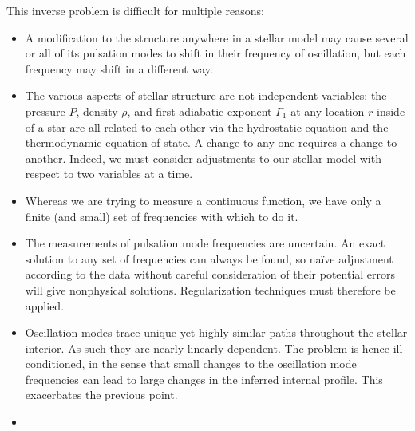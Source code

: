 \documentclass[twocolumn,twocolappendix]{aastex6}
\begin{document}
This inverse problem is difficult for multiple reasons:%
\begin{itemize}
    \item A modification to the structure anywhere in a stellar model may cause several or all of its pulsation modes to shift in their frequency of oscillation, but each frequency may shift in a different way. 
    \item The various aspects of stellar structure are not independent variables: the pressure $P$, density $\rho$, and first adiabatic exponent $\Gamma_1$ at any location $r$ inside of a star are all related to each other via the hydrostatic equation and the thermodynamic equation of state. 
    A change to any one requires a change to another. 
    Indeed, we must consider adjustments to our stellar model with respect to two variables at a time. 
    \item Whereas we are trying to measure a continuous function, we have only a finite (and small) set of frequencies with which to do it. %
    \item The measurements of pulsation mode frequencies are uncertain. An exact solution to any set of frequencies can always be found, so na\"ive adjustment according to the data without careful consideration of their potential errors will give nonphysical solutions. Regularization techniques must therefore be applied. 
    \item Oscillation modes trace unique yet highly similar paths throughout the stellar interior. As such they are nearly linearly dependent. The problem is hence ill-conditioned, in the sense that small changes to the oscillation mode frequencies can lead to large changes in the inferred internal profile. This exacerbates the previous point. 
    \item %

\end{itemize}
\end{document}
